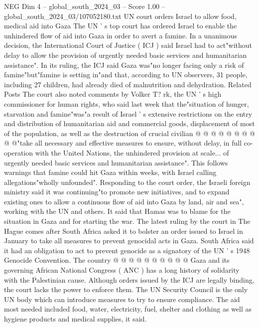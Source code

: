 \begin{textsample}{NEG Dim 4 – global\_south\_2024\_03 – Score 1.00 – global\_south\_2024\_03/107052180.txt}  \label{ex:f4_neg_353}
UN court orders Israel to allow food, medical aid into Gaza The UN ' s top court has ordered Israel to enable the unhindered flow of aid into Gaza in order to avert a famine.
In a unanimous decision, the International Court of Justice ( ICJ ) said Israel had to act"without delay to allow the provision of urgently needed basic services and humanitarian assistance".
In its ruling, the ICJ said Gaza was"no longer facing only a risk of famine"but"famine is setting in"and that, according to UN observers, 31 people, including 27 children, had already died of malnutrition and dehydration.
Related Posts The court also noted comments by Volker T? rk, the UN ' s high commissioner for human rights, who said last week that the"situation of hunger, starvation and famine"was"a result of Israel ' s extensive restrictions on the entry and distribution of humanitarian aid and commercial goods, displacement of most of the population, as well as the destruction of crucial civilian @ @ @ @ @ @ @ @ @ @"take all necessary and effective measures to ensure, without delay, in full co-operation with the United Nations, the unhindered provision at scale... of urgently needed basic services and humanitarian assistance".
This follows warnings that famine could hit Gaza within weeks, with Israel calling allegations"wholly unfounded".
Responding to the court order, the Israeli foreign ministry said it was continuing"to promote new initiatives, and to expand existing ones to allow a continuous flow of aid into Gaza by land, air and sea", working with the UN and others.
It said that Hamas was to blame for the situation in Gaza and for starting the war.
The latest ruling by the court in The Hague comes after South Africa asked it to bolster an order issued to Israel in January to take all measures to prevent genocidal acts in Gaza.
South Africa said it had an obligation to act to prevent genocide as a signatory of the UN ' s 1948 Genocide Convention.
The country @ @ @ @ @ @ @ @ @ @ Gaza and its governing African National Congress ( ANC ) has a long history of solidarity with the Palestinian cause.
Although orders issued by the ICJ are legally binding, the court lacks the power to enforce them.
The UN Security Council is the only UN body which can introduce measures to try to ensure compliance.
The aid most needed included food, water, electricity, fuel, shelter and clothing as well as hygiene products and medical supplies, it said.

\end{textsample}
